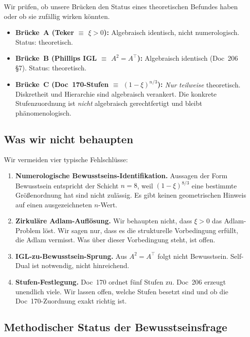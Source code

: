 Wir prüfen, ob unsere Brücken den Status eines theoretischen Befundes haben oder ob sie zufällig wirken könnten.

\begin{itemize}
\item \textbf{Brücke~A (Teker $\equiv$ $\xi > 0$):} Algebraisch identisch, nicht numerologisch. Status: theoretisch.
\item \textbf{Brücke~B (Phillips IGL $\equiv$ $A^2 = A^\top$):} Algebraisch identisch (Doc~206 \S7). Status: theoretisch.
\item \textbf{Brücke~C (Doc~170-Stufen $\equiv$ $(1-\xi)^{n/3}$):} \emph{Nur teilweise} theoretisch. Diskretheit und Hierarchie sind algebraisch verankert. Die konkrete Stufenzuordnung ist \emph{nicht} algebraisch gerechtfertigt und bleibt phänomenologisch.
\end{itemize}

\subsection{Was wir nicht behaupten}

Wir vermeiden vier typische Fehlschlüsse:

\begin{enumerate}
\item \textbf{Numerologische Bewusstseins-Identifikation.} Aussagen der Form \glqq Bewusstsein entspricht der Schicht $n = 8$, weil $(1-\xi)^{8/3}$ eine bestimmte Größenordnung hat\grqq{} sind nicht zulässig. Es gibt keinen geometrischen Hinweis auf einen ausgezeichneten $n$-Wert.
\item \textbf{Zirkuläre Adlam-Auflösung.} Wir behaupten nicht, dass $\xi > 0$ das Adlam-Problem \glqq löst\grqq{}. Wir sagen nur, dass es die strukturelle Vorbedingung erfüllt, die Adlam vermisst. Was über dieser Vorbedingung steht, ist offen.
\item \textbf{IGL-zu-Bewusstsein-Sprung.} Aus $A^2 = A^\top$ folgt nicht Bewusstsein. Self-Dual ist notwendig, nicht hinreichend.
\item \textbf{Stufen-Festlegung.} Doc~170 ordnet fünf Stufen zu. Doc~206 erzeugt unendlich viele. Wir lassen offen, welche Stufen \glqq besetzt\grqq{} sind und ob die Doc~170-Zuordnung exakt richtig ist.
\end{enumerate}

\subsection{Methodischer Status der Bewusstseinsfrage}

